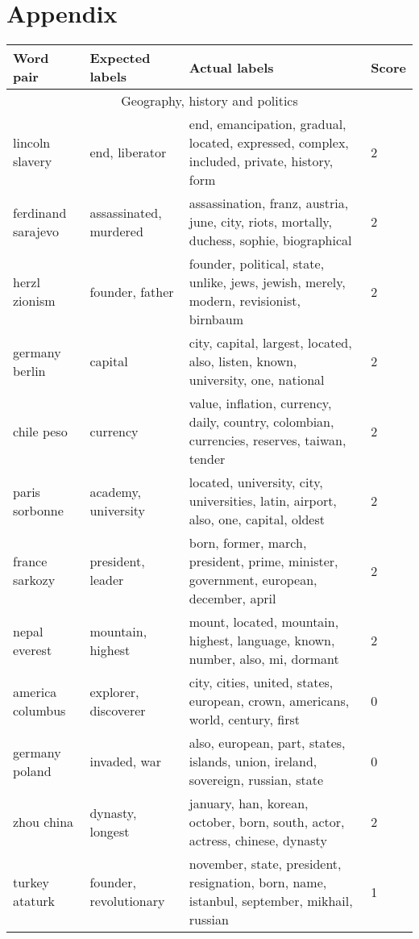 \documentclass[11pt,a4paper]{article}
\begin{document}
\section*{\centering Appendix}
\begin{longtable}[c]{|l|l|p{5cm}|l|}
\hline
\textbf{Word pair}        & \textbf{Expected labels} & \textbf{Actual labels} & \textbf{Score} \\
\hline \hline
\endhead
\multicolumn{4}{|c|}{Geography, history and politics} \\ \hline 
lincoln slavery  & end, liberator & end, emancipation, gradual, located, expressed, complex, included, private, history, form & 2 \\ \hline 
ferdinand sarajevo  & assassinated, murdered & assassination, franz, austria, june, city, riots, mortally, duchess, sophie, biographical & 2 \\ \hline 
herzl zionism  & founder, father & founder, political, state, unlike, jews, jewish, merely, modern, revisionist, birnbaum & 2 \\ \hline 
germany berlin  & capital & city, capital, largest, located, also, listen, known, university, one, national & 2 \\ \hline 
chile peso  & currency & value, inflation, currency, daily, country, colombian, currencies, reserves, taiwan, tender & 2 \\ \hline 
paris sorbonne  & academy, university & located, university, city, universities, latin, airport, also, one, capital, oldest & 2 \\ \hline 
france sarkozy  & president, leader & born, former, march, president, prime, minister, government, european, december, april & 2 \\ \hline 
nepal everest  & mountain, highest & mount, located, mountain, highest, language, known, number, also, mi, dormant & 2 \\ \hline 
america columbus  & explorer, discoverer & city, cities, united, states, european, crown, americans, world, century, first & 0 \\ \hline 
germany poland  & invaded, war & also, european, part, states, islands, union, ireland, sovereign, russian, state & 0 \\ \hline 
zhou china  & dynasty, longest & january, han, korean, october, born, south, actor, actress, chinese, dynasty & 2 \\ \hline 
turkey ataturk  & founder, revolutionary & november, state, president, resignation, born, name, istanbul, september, mikhail, russian & 1 \\ \hline 

\end{longtable}
\end{document}
